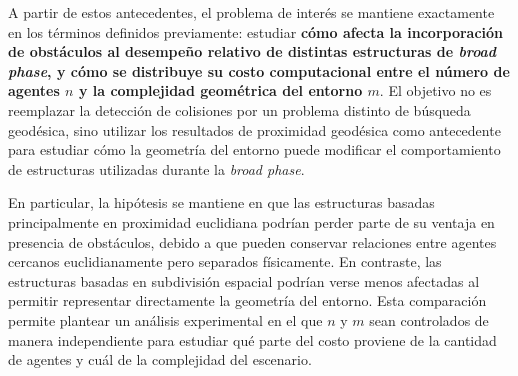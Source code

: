 \documentclass[12pt]{article}
\begin{document}
A partir de estos antecedentes, el problema de interés se mantiene exactamente en los términos definidos previamente: estudiar \textbf{cómo afecta la incorporación de obstáculos al desempeño relativo de distintas estructuras de \textit{broad phase}, y cómo se distribuye su costo computacional entre el número de agentes \(n\) y la complejidad geométrica del entorno \(m\)}. El objetivo no es reemplazar la detección de colisiones por un problema distinto de búsqueda geodésica, sino utilizar los resultados de proximidad geodésica como antecedente para estudiar cómo la geometría del entorno puede modificar el comportamiento de estructuras utilizadas durante la \textit{broad phase}.

En particular, la hipótesis se mantiene en que las estructuras basadas principalmente en proximidad euclidiana podrían perder parte de su ventaja en presencia de obstáculos, debido a que pueden conservar relaciones entre agentes cercanos euclidianamente pero separados físicamente. En contraste, las estructuras basadas en subdivisión espacial podrían verse menos afectadas al permitir representar directamente la geometría del entorno. Esta comparación permite plantear un análisis experimental en el que \(n\) y \(m\) sean controlados de manera independiente para estudiar qué parte del costo proviene de la cantidad de agentes y cuál de la complejidad del escenario.

\printbibliography
\end{document}

